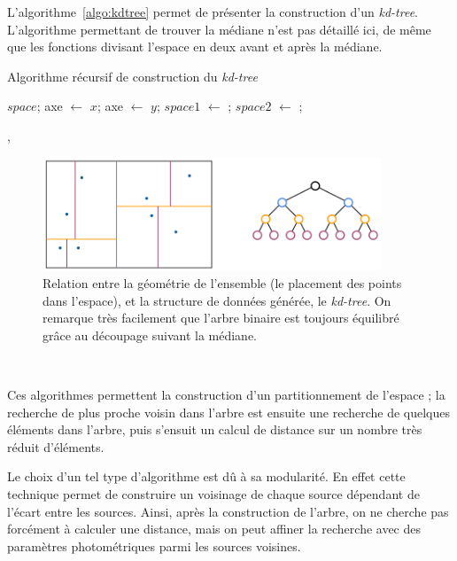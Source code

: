 L'algorithme~\ref{algo:kdtree} permet de présenter la construction d'un \emph{kd-tree}. L'algorithme permettant de trouver la médiane n'est pas détaillé ici, de même que les fonctions divisant l'espace en deux avant et après la médiane.
	\begin{algorithm}
		\caption{Algorithme récursif de construction du \emph{kd-tree}}
		\label{algo:kdtree}
		\begin{algorithmic}[1]
					\State \Return $space$;
				\Else
						\State axe $\gets$ $x$;
					\Else
						\State axe $\gets$ $y$;
					\EndIf
					\State $space1$ $\gets$ ;
					\State $space2$ $\gets$ ;

					\State \Return {}, 
				\EndIf
			\EndFunction
		\end{algorithmic}
	\end{algorithm}
	\begin{figure}[h]
		\centering
		\includegraphics[width=0.9\textwidth]{img/kdtree.png}
		\caption[Relation entre la géométrie de l'ensemble et le \emph{kd-tree} généré]{Relation entre la géométrie de l'ensemble (le placement des points dans l'espace), et la structure de données générée, le \emph{kd-tree}. On remarque très facilement que l'arbre binaire est toujours équilibré grâce au découpage suivant la médiane.}
		\label{fig:kdtree}
	\end{figure}

\

Ces algorithmes permettent la construction d'un partitionnement de l'espace ; la recherche de plus proche voisin dans l'arbre est ensuite une recherche de quelques éléments dans l'arbre, puis s'ensuit un calcul de distance sur un nombre très réduit d'éléments.

Le choix d'un tel type d'algorithme est dû à sa modularité. En effet cette technique permet de construire un voisinage de chaque source dépendant de l'écart entre les sources. Ainsi, après la construction de l'arbre, on ne cherche pas forcément à calculer une distance, mais on peut affiner la recherche avec des paramètres photométriques parmi les sources voisines.

